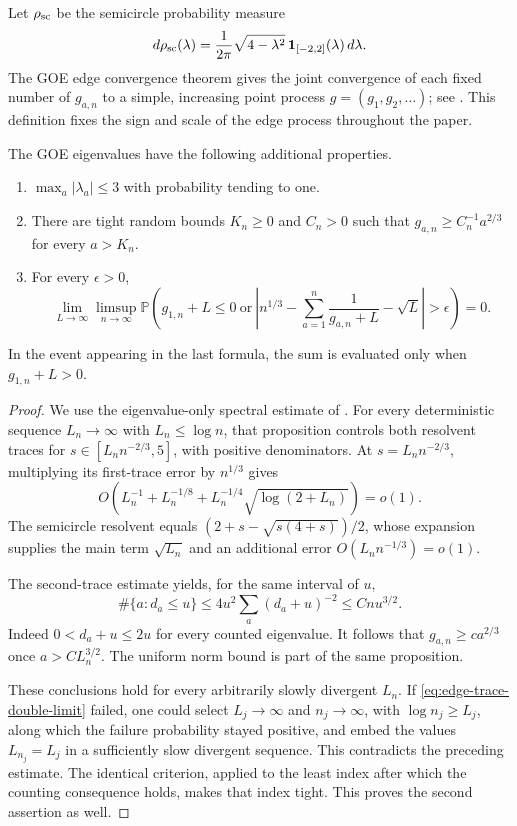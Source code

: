 Let $\rho_{\rm sc}$ be the semicircle probability measure
\[
 d\rho_{\rm sc}(\lambda)=\frac1{2\pi}
 \sqrt{4-\lambda^2}\,\mathbf 1_{[-2,2]}(\lambda)\,d\lambda.
\]
The GOE edge convergence theorem gives the joint convergence of each fixed
number of $g_{a,n}$ to a simple, increasing point process
$g=(g_1,g_2,\ldots)$; see \cite{RamirezRiderVirag2011}.  This definition fixes the sign and
scale of the edge process throughout the paper.

\begin{lemma}\label{lem:edge-spectral}
The GOE eigenvalues have the following additional properties.
\begin{enumerate}
\item $\max_a|\lambda_a|\le3$ with probability tending to one.
\item There are tight random bounds $K_n\ge0$ and $C_n>0$ such that
$g_{a,n}\ge C_n^{-1}a^{2/3}$ for every $a>K_n$.
\item For every $\epsilon>0$,
\begin{equation}\label{eq:edge-trace-double-limit}
 \lim_{L\to\infty}\limsup_{n\to\infty}
 \mathbb P\!\left(
 g_{1,n}+L\le0\ \text{or}\
 \left|n^{1/3}-\sum_{a=1}^n\frac1{g_{a,n}+L}-\sqrt L\right|
       >\epsilon\right)=0.
\end{equation}
\end{enumerate}
In the event appearing in the last formula, the sum is evaluated only when
$g_{1,n}+L>0$.
\end{lemma}

\begin{proof}
We use the eigenvalue-only spectral estimate of \cite[Proposition~3.1]{CS}.  For every
deterministic sequence $L_n\to\infty$ with $L_n\le\log n$, that proposition
controls both resolvent traces for
$s\in[L_nn^{-2/3},5]$, with positive denominators.  At
$s=L_nn^{-2/3}$, multiplying its first-trace error by $n^{1/3}$ gives
\[
 O\!\left(L_n^{-1}+L_n^{-1/8}
       +L_n^{-1/4}\sqrt{\log(2+L_n)}\right)=o(1).
\]
The semicircle resolvent equals
$(2+s-\sqrt{s(4+s)})/2$, whose expansion supplies the main term
$\sqrt{L_n}$ and an additional error $O(L_nn^{-1/3})=o(1)$.

The second-trace estimate yields, for the same interval of $u$,
\[
 \#\{a:d_a\le u\}
 \le 4u^2\sum_a(d_a+u)^{-2}
 \le Cnu^{3/2}.
\]
Indeed $0<d_a+u\le2u$ for every counted eigenvalue.  It follows that
$g_{a,n}\ge c a^{2/3}$ once $a>CL_n^{3/2}$.  The uniform norm bound is
part of the same proposition.

These conclusions hold for every arbitrarily slowly divergent $L_n$.
If \eqref{eq:edge-trace-double-limit} failed, one could select
$L_j\to\infty$ and $n_j\to\infty$, with $\log n_j\ge L_j$, along which
the failure probability stayed positive, and embed the values
$L_{n_j}=L_j$ in a sufficiently slow divergent sequence.  This contradicts
the preceding estimate.  The identical criterion, applied to the least
index after which the counting consequence holds, makes that index tight.
This proves the second assertion as well.
\end{proof}


